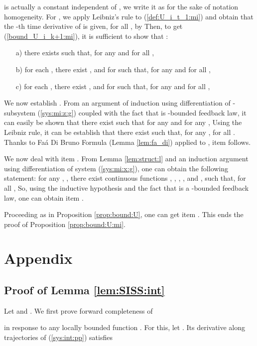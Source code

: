 \documentclass[letterpaper, 10pt]{article}
\newcommand{\rref}[1]{(\ref{#1})}
\begin{document}
 is actually a constant independent of , we write it as  for the sake of notation homogeneity. For , we apply Leibniz's rule to \rref{def:U_i_t_1:mi} and obtain that the -th time derivative of  is given, for all , by 
 Then, to get \rref{bound_U_i_k+1:mi}, it is sufficient to show that :
\begin{itemize}
\item[a)] there exists  such that, for any  and for all , 

\item[b)] for each , there exist , and  for  such that, for any  and for all , 

\item[c)] for each , there exist , and  for  such that, for any  and for all , 

\end{itemize}

We now establish . From an argument of induction using differentiation of -subsystem \rref{sys:mi:z:g} coupled with the fact that  is -bounded feedback law, it can easily be shown that there exist  such that for any  and for any ,   Using the Leibniz rule, it can be establish that there exist  such that, for any ,  for all . Thanks to Fa\'a Di Bruno Formula (Lemma \ref{lem:fa_di}) applied to , item  follows.


 
We now deal with item . From Lemma \ref{lem:struct:l} and an induction argument using differentiation of system \rref{sys:mi:x:g}, one can obtain the following statement: for any , , there exist continuous functions ,  , ,  , and , such that, for all , 
 So, using the inductive hypothesis and the fact that  is a -bounded feedback law, one can obtain item .


Proceeding as in Proposition \ref{prop:bound:U}, one can get item . This ends the proof of Proposition \ref{prop:bound:U:mi}.

\section{Appendix}
\subsection{Proof of Lemma \ref{lem:SISS:int} }

Let  and . We first prove forward completeness of 

in response to any locally bounded function . For this, let . Its derivative along trajectories of \rref{sys:int:pp} satisfies
\end{document}
